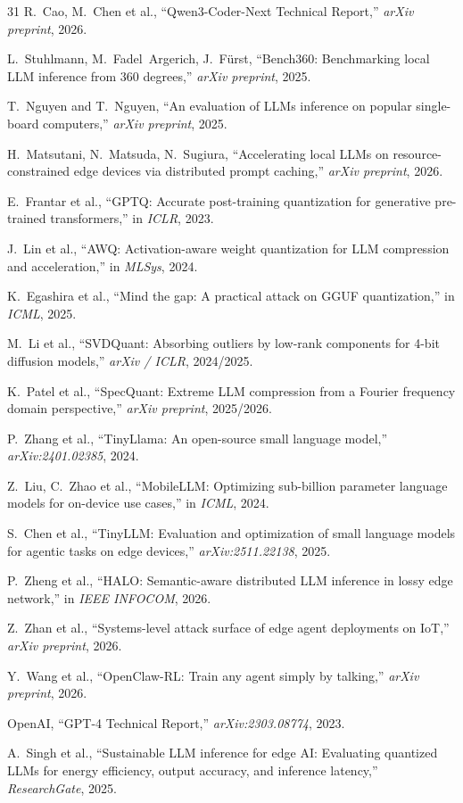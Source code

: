 \documentclass[conference]{IEEEtran}
\begin{document}
\begin{thebibliography}{31}
R.~Cao, M.~Chen et al., ``Qwen3-Coder-Next Technical Report,'' \emph{arXiv preprint}, 2026.

L.~Stuhlmann, M.~Fadel~Argerich, J.~F\"urst, ``Bench360: Benchmarking local LLM inference from 360 degrees,'' \emph{arXiv preprint}, 2025.

T.~Nguyen and T.~Nguyen, ``An evaluation of LLMs inference on popular single-board computers,'' \emph{arXiv preprint}, 2025.

H.~Matsutani, N.~Matsuda, N.~Sugiura, ``Accelerating local LLMs on resource-constrained edge devices via distributed prompt caching,'' \emph{arXiv preprint}, 2026.

E.~Frantar et al., ``GPTQ: Accurate post-training quantization for generative pre-trained transformers,'' in \emph{ICLR}, 2023.

J.~Lin et al., ``AWQ: Activation-aware weight quantization for LLM compression and acceleration,'' in \emph{MLSys}, 2024.

K.~Egashira et al., ``Mind the gap: A practical attack on GGUF quantization,'' in \emph{ICML}, 2025.

M.~Li et al., ``SVDQuant: Absorbing outliers by low-rank components for 4-bit diffusion models,'' \emph{arXiv / ICLR}, 2024/2025.

K.~Patel et al., ``SpecQuant: Extreme LLM compression from a Fourier frequency domain perspective,'' \emph{arXiv preprint}, 2025/2026.

P.~Zhang et al., ``TinyLlama: An open-source small language model,'' \emph{arXiv:2401.02385}, 2024.

Z.~Liu, C.~Zhao et al., ``MobileLLM: Optimizing sub-billion parameter language models for on-device use cases,'' in \emph{ICML}, 2024.

S.~Chen et al., ``TinyLLM: Evaluation and optimization of small language models for agentic tasks on edge devices,'' \emph{arXiv:2511.22138}, 2025.

P.~Zheng et al., ``HALO: Semantic-aware distributed LLM inference in lossy edge network,'' in \emph{IEEE INFOCOM}, 2026.



Z.~Zhan et al., ``Systems-level attack surface of edge agent deployments on IoT,'' \emph{arXiv preprint}, 2026.

Y.~Wang et al., ``OpenClaw-RL: Train any agent simply by talking,'' \emph{arXiv preprint}, 2026.

OpenAI, ``GPT-4 Technical Report,'' \emph{arXiv:2303.08774}, 2023.

A.~Singh et al., ``Sustainable LLM inference for edge AI: Evaluating quantized LLMs for energy efficiency, output accuracy, and inference latency,'' \emph{ResearchGate}, 2025.

\end{thebibliography}
\end{document}

